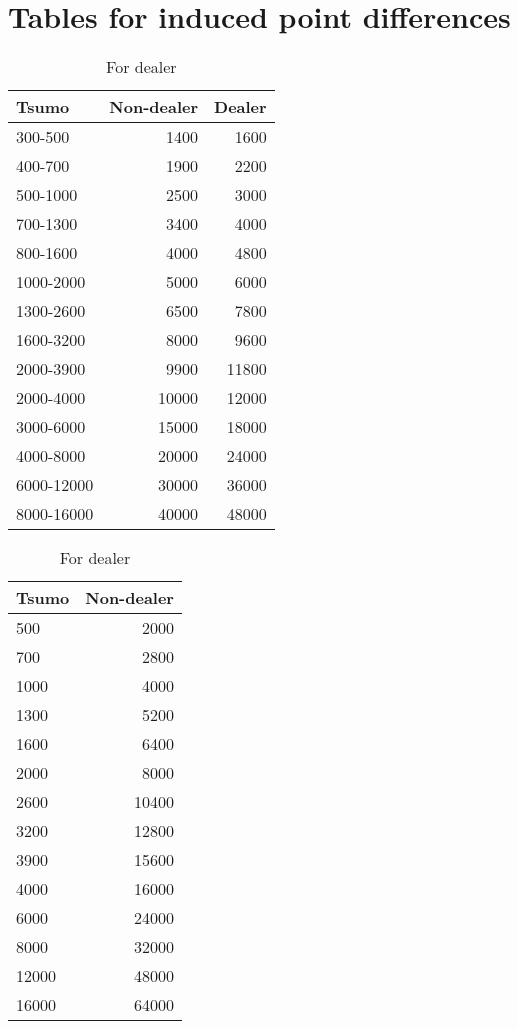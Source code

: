 \newpage

\section{Tables for induced point differences}

{\begin{table}[h!]
\centering\captionsetup{font=small}\small
\begin{minipage}[h]{0.49\hsize}
\caption{For non-dealer} \label{tbl:pd5}
\begin{tabular}{l r r}
\toprule
{ Tsumo} & {\footnotesize Non-dealer} & {\footnotesize Dealer}\\
\midrule
300-500 &	1400	& 1600\\
400-700 &	1900	&2200\\
500-1000&2500&3000\\
700-1300&3400&4000\\
800-1600&4000&4800\\
1000-2000&5000&6000\\
1300-2600&6500&7800\\
1600-3200&8000&9600\\
2000-3900&9900&11800\\
2000-4000&10000&12000\\
3000-6000&15000&18000\\
4000-8000&20000&24000\\
6000-12000&30000&36000\\
8000-16000&40000&48000\\
\bottomrule
\end{tabular}
\end{minipage}
    \hfill
\begin{minipage}[h]{0.49\hsize}\centering
\caption{For dealer} \label{tbl:pd6}
\begin{tabular}{l r}
\toprule
{Tsumo} & {\footnotesize Non-dealer} \\
\midrule
500&	2000\\
700&	2800\\
1000&4000\\
1300&5200\\
1600&6400\\
2000&8000\\
2600&10400\\
3200&12800\\
3900&15600\\
4000&16000\\
6000&24000\\
8000&32000\\
12000&48000\\
16000&64000\\
\bottomrule
\end{tabular}
\end{minipage}
\end{table}}


\newpage
\thispagestyle{empty}
\mbox{}

\newpage
\thispagestyle{empty}
\mbox{}
